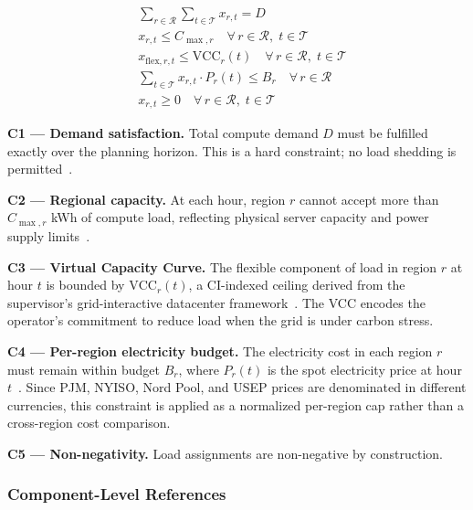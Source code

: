 \begin{align}
  &\sum_{r \in \mathcal{R}} \sum_{t \in \mathcal{T}} x_{r,t} = D
  \tag{C1} \label{eq:c1} \\[4pt]
  &x_{r,t} \leq C_{\max,r} \quad \forall\, r \in \mathcal{R},\; t \in \mathcal{T}
  \tag{C2} \label{eq:c2} \\[4pt]
  &x_{\mathrm{flex},r,t} \leq \mathrm{VCC}_r(t) \quad \forall\, r \in \mathcal{R},\; t \in \mathcal{T}
  \tag{C3} \label{eq:c3} \\[4pt]
  &\sum_{t \in \mathcal{T}} x_{r,t} \cdot P_r(t) \leq B_r \quad \forall\, r \in \mathcal{R}
  \tag{C4} \label{eq:c4} \\[4pt]
  &x_{r,t} \geq 0 \quad \forall\, r \in \mathcal{R},\; t \in \mathcal{T}
  \tag{C5} \label{eq:c5}
\end{align}

\textbf{C1 — Demand satisfaction.}
Total compute demand $D$ must be fulfilled exactly over the planning horizon.
This is a hard constraint; no load shedding is permitted~\cite{liu2012}.

\textbf{C2 — Regional capacity.}
At each hour, region $r$ cannot accept more than $C_{\max,r}$ kWh of compute load, reflecting physical server capacity and power supply limits~\cite{liu2012}.

\textbf{C3 — Virtual Capacity Curve.}
The flexible component of load in region $r$ at hour $t$ is bounded by $\mathrm{VCC}_r(t)$, a CI-indexed ceiling derived from the supervisor's grid-interactive datacenter framework~\cite{colangelo2025}.
The VCC encodes the operator's commitment to reduce load when the grid is under carbon stress.

\textbf{C4 — Per-region electricity budget.}
The electricity cost in each region $r$ must remain within budget $B_r$, where $P_r(t)$ is the spot electricity price at hour $t$~\cite{hao2024joint}.
Since PJM, NYISO, Nord Pool, and USEP prices are denominated in different currencies, this constraint is applied as a normalized per-region cap rather than a cross-region cost comparison.

\textbf{C5 — Non-negativity.}
Load assignments are non-negative by construction.

\subsubsection*{Component-Level References}

